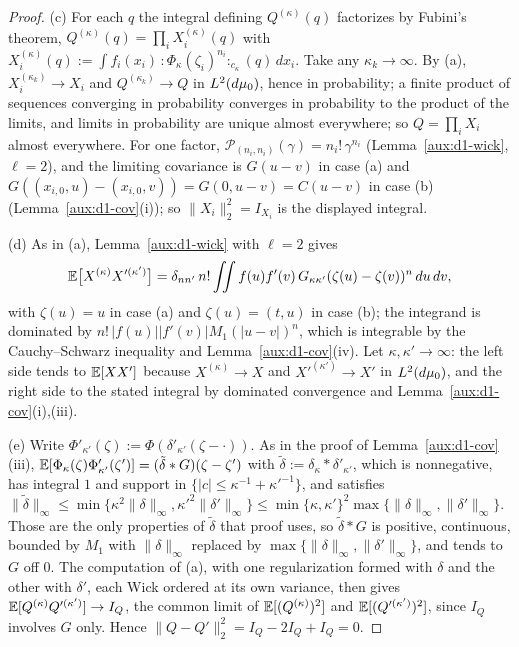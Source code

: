 \begin{proof}
(c) For each $q$ the integral defining $Q^{(\kappa)}(q)$ factorizes by Fubini's theorem,
$Q^{(\kappa)}(q)=\prod_iX_i^{(\kappa)}(q)$ with
$X_i^{(\kappa)}(q):=\int f_i(x_i)\,{:}\Phi_\kappa(\zeta_i)^{n_i}{:}_{c_\kappa}(q)\,dx_i$. Take any
$\kappa_k\to\infty$. By (a), $X_i^{(\kappa_k)}\to X_i$ and $Q^{(\kappa_k)}\to Q$ in $L^2(d\mu_0)$,
hence in probability; a finite product of sequences converging in probability converges in
probability to the product of the limits, and limits in probability are unique almost
everywhere; so $Q=\prod_iX_i$ almost everywhere. For one factor,
$\mathcal P_{(n_i,n_i)}(\gamma)=n_i!\,\gamma^{n_i}$ (Lemma~\ref{aux:d1-wick}, $\ell=2$), and the
limiting covariance is $G(u-v)$ in case (a) and $G((x_{i,0},u)-(x_{i,0},v))=G(0,u-v)=C(u-v)$ in
case (b) (Lemma~\ref{aux:d1-cov}(i)); so $\|X_i\|_2^2=I_{X_i}$ is the displayed integral.

(d) As in (a), Lemma~\ref{aux:d1-wick} with $\ell=2$ gives
\[
 \mathbb{E}\bigl[X^{(\kappa)}X'^{(\kappa')}\bigr]=\delta_{nn'}\,n!\iint f(u)f'(v)\,
 G_{\kappa\kappa'}(\zeta(u)-\zeta(v))^n\,du\,dv ,
\]
with $\zeta(u)=u$ in case (a) and $\zeta(u)=(t,u)$ in case (b); the integrand is dominated by $n!\,|f(u)||f'(v)|M_1(|u-v|)^n$, which is integrable by the
Cauchy--Schwarz inequality and Lemma~\ref{aux:d1-cov}(iv). Let $\kappa,\kappa'\to\infty$: the
left side tends to $\mathbb{E}[XX']$ because $X^{(\kappa)}\to X$ and $X'^{(\kappa')}\to X'$ in
$L^2(d\mu_0)$, and the right side to the stated integral by dominated convergence and
Lemma~\ref{aux:d1-cov}(i),(iii).

(e) Write $\Phi'_{\kappa'}(\zeta):=\Phi(\delta'_{\kappa'}(\zeta-\cdot))$.  As in the proof of
Lemma~\ref{aux:d1-cov}(iii), $\mathbb{E}[\Phi_\kappa(\zeta)\Phi'_{\kappa'}(\zeta')]=(\tilde\delta*G)
(\zeta-\zeta')$ with $\tilde\delta:=\delta_\kappa*\delta'_{\kappa'}$, which is nonnegative, has
integral $1$ and support in $\{|c|\le\kappa^{-1}+\kappa'^{-1}\}$, and satisfies
$\|\tilde\delta\|_\infty\le\min\{\kappa^2\|\delta\|_\infty,\kappa'^2\|\delta'\|_\infty\}\le
\min\{\kappa,\kappa'\}^2\max\{\|\delta\|_\infty,\|\delta'\|_\infty\}$.  Those are the only
properties of $\tilde\delta$ that proof uses, so $\tilde\delta*G$ is positive, continuous, bounded
by $M_1$ with $\|\delta\|_\infty$ replaced by $\max\{\|\delta\|_\infty,\|\delta'\|_\infty\}$, and
tends to $G$ off $0$.  The computation of (a), with one regularization formed with $\delta$ and
the other with $\delta'$, each Wick ordered at its own variance, then gives
$\mathbb{E}[Q^{(\kappa)}Q'^{(\kappa')}]\to I_Q$, the common limit of $\mathbb{E}[(Q^{(\kappa)})^2]$ and
$\mathbb{E}[(Q'^{(\kappa')})^2]$, since $I_Q$ involves $G$ only.  Hence
$\|Q-Q'\|_2^2=I_Q-2I_Q+I_Q=0$.


\end{proof}
